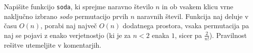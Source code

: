 \documentclass[arhiv]{../izpit}
\begin{document}
  Napišite funkcijo \verb|soda|, ki sprejme naravno število $n$ in ob vsakem klicu vrne naključno izbrano \emph{sodo} permutacijo prvih $n$ naravnih števil. Funkcija naj deluje v času $O(n)$, porabi naj največ $O(n)$ dodatnega prostora, vsaka permutacija pa naj se pojavi z enako verjetnostjo (ki je za $n < 2$ enaka $1$, sicer pa $\frac{2}{n!}$). Pravilnost rešitve utemeljite v komentarjih.
\end{document}
